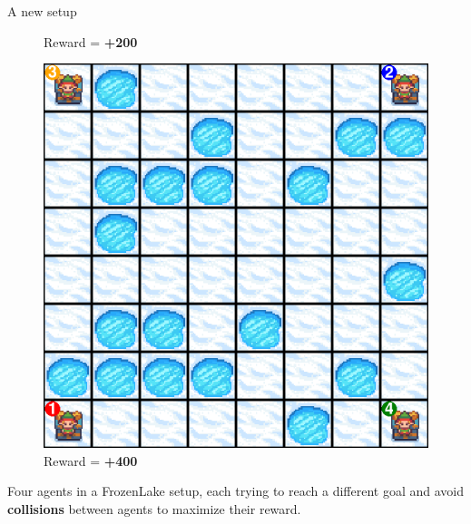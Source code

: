 \documentclass[aspectratio=169,xcolor=dvipsnames]{beamer}
\begin{document}
\begin{frame}{A new setup}
\begin{figure}[h!]
\begin{minipage}{0.3\textwidth}
            \caption{Reward = \textbf{+200}}
        \end{minipage}%
        \hspace{10pt}
        \begin{minipage}{0.3\textwidth} 
            \centering
            \includegraphics[scale=0.2]{images/step_010.png}
            \caption{Reward = \textbf{+400}}
        \end{minipage}
    \end{figure}

    Four agents in a FrozenLake setup, each trying to reach a different goal and avoid \textbf{collisions} between agents to maximize their reward.

\end{frame}

\end{document}
